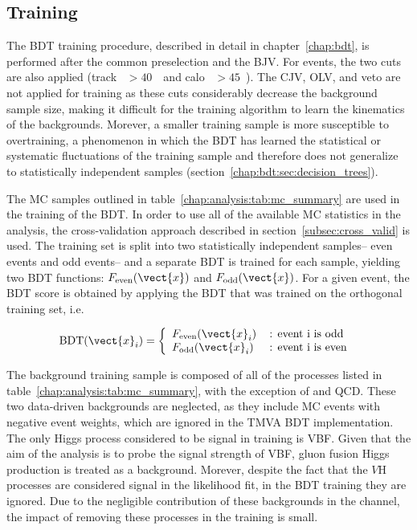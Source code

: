 \subsection{Training}

The BDT training procedure, described in detail in
chapter~\ref{chap:bdt}, is performed after the common preselection and
the BJV. For \eemm events, the two \etmiss cuts are also applied
(track \etmiss~$>40$~\gev~and calo \etmiss~$>45$~\gev). The
CJV, OLV, and \Ztautaunody veto are not applied for training as these
cuts considerably decrease the background sample size, making it difficult for
the training algorithm to learn the kinematics of the
backgrounds. Morever, a smaller training sample is more susceptible to
overtraining, a phenomenon in which the BDT has learned the
statistical or systematic fluctuations of the training sample and therefore does not
generalize to statistically independent samples
(section~\ref{chap:bdt:sec:decision_trees}).

The MC samples outlined in table~\ref{chap:analysis:tab:mc_summary} are used
in the training of the BDT. In order to use all of the available MC
statistics in the analysis, the cross-validation approach described
in section~\ref{subsec:cross_valid} is used. The training set is split
into two statistically independent samples-- even events and odd
events-- and a separate BDT is trained for each sample, yielding two
BDT functions: $F_{\textrm{even}}(\vect{x})$ and
$F_{\textrm{odd}}(\vect{x})$. For a given event, the BDT score is
obtained by applying the BDT that was trained on the orthogonal
training set, i.e.

 \begin{equation}
   \textrm{BDT}(\vect{x}_i) = \left\{
   \begin{array} {ll}
     F_{\textrm{even}}(\vect{x}_i) & \, \textrm{: event i is odd }
     \\
     F_{\textrm{odd}}(\vect{x}_i) & \, \textrm{: event i is even }
    \end{array} \right.
 \end{equation}

The background training sample is composed of all of the processes
listed in table~\ref{chap:analysis:tab:mc_summary}, with the exception of
\wjets and QCD. These two data-driven backgrounds are neglected, as
they include MC events with negative event weights, which are ignored
in the TMVA BDT implementation. The only Higgs process considered to
be signal in training is VBF. Given that the aim of the analysis is to
probe the signal strength of VBF, gluon fusion Higgs production is
treated as a background. Morever, despite the fact that the $V$H
processes are considered signal in the likelihood fit, in the BDT
training they are ignored. Due to the negligible contribution of these
backgrounds in the \lnln channel, the impact of removing these
processes in the training is small. 


